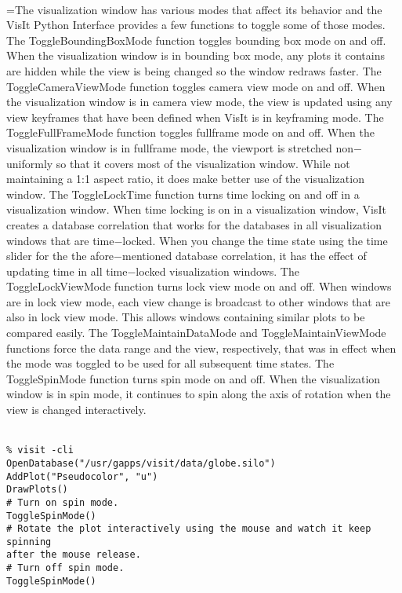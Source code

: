 \documentclass[10pt,a4paper]{report}
\begin{document}
 \\ 
\hangindent=\parindent The visualization window has various modes that affect its behavior and the VisIt Python Interface provides a few functions to toggle some of those modes.  The ToggleBoundingBoxMode function toggles bounding box mode on and off. When the visualization window is in bounding box mode, any plots it contains are hidden while the view is being changed so the window redraws faster.  The ToggleCameraViewMode function toggles camera view mode on and off. When the visualization window is in camera view mode, the view is updated using any view keyframes that have been defined when VisIt is in keyframing mode. The ToggleFullFrameMode function toggles fullframe mode on and off. When the visualization window is in fullframe mode, the viewport is stretched non$-$uniformly so that it covers most of the visualization window. While not maintaining a 1:1 aspect ratio, it does make better use of the visualization window. The ToggleLockTime function turns time locking on and off in a visualization window. When time locking is on in a visualization window, VisIt creates a database correlation that works for the databases in all visualization windows that are time$-$locked. When you change the time state using the time slider for the the afore$-$mentioned database correlation, it has the effect of updating time in all time$-$locked visualization windows. The ToggleLockViewMode function turns lock view mode on and off. When windows are in lock view mode, each view change is broadcast to other windows that are also in lock view mode. This allows windows containing similar plots to be compared easily. The ToggleMaintainDataMode and ToggleMaintainViewMode functions force the data range and the view, respectively, that was in effect when the mode was toggled to be used for all subsequent time states. The ToggleSpinMode function turns spin mode on and off. When the visualization window is in spin mode, it continues to spin along the axis of rotation when the view is changed interactively. \\[-3mm] 

\\[-6mm]
\begin{verbatim}% visit -cli
OpenDatabase("/usr/gapps/visit/data/globe.silo")
AddPlot("Pseudocolor", "u")
DrawPlots()
# Turn on spin mode.
ToggleSpinMode()
# Rotate the plot interactively using the mouse and watch it keep spinning
after the mouse release.
# Turn off spin mode.
ToggleSpinMode()
\end{verbatim}
\newpage
\end{document}
